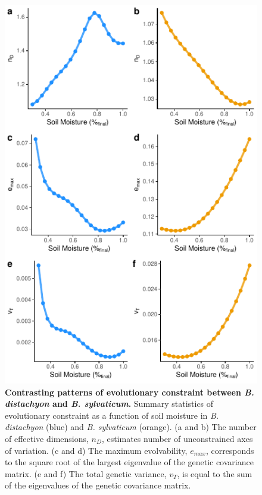 \documentclass[jou,floatsintext]{apa6}
\begin{document}
\begin{figure}[!h]
\includegraphics[width=\textwidth]{../Figures/constraints_byspecies} \caption{\textbf{Contrasting patterns of evolutionary constraint between \emph{B. distachyon} and \emph{B. sylvaticum}.} Summary statistics of evolutionary constraint as a function of soil moisture in \emph{B. distachyon} (blue) and \emph{B. sylvaticum} (orange). (a and b) The number of effective dimensions, \(n_D\), estimates number of unconstrained axes of variation. (c and d) The maximum evolvability, \(e_{max}\), corresponds to the square root of the largest eigenvalue of the genetic covariance matrix. (e and f) The total genetic variance, \(v_T\), is equal to the sum of the eigenvalues of the genetic covariance matrix.}\label{fig:constraints}
\end{figure}
\end{document}
